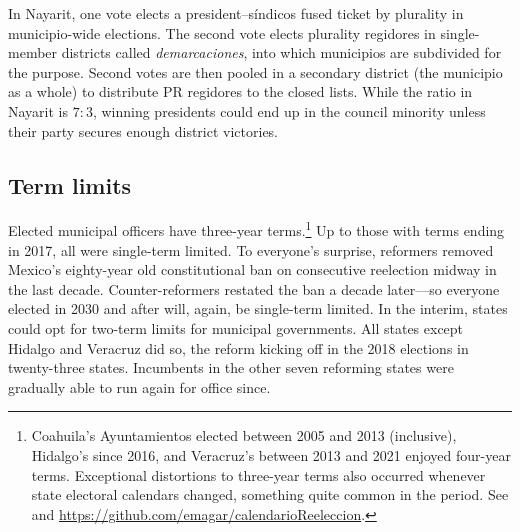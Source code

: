 \documentclass[letter,12pt]{article}
\begin{document}
In Nayarit, one vote elects a president--síndicos fused ticket by plurality in municipio-wide elections. The second vote elects plurality regidores in single-member districts called \emph{demarcaciones}, into which municipios are subdivided for the purpose. Second votes are then pooled in a secondary district (the municipio as a whole) to distribute PR regidores to the closed lists. While the ratio in Nayarit is $7:3$, winning presidents could end up in the council minority unless their party secures enough district victories.

\subsection{Term limits}
Elected municipal officers have three-year terms.\footnote{Coahuila's Ayuntamientos elected between 2005 and 2013 (inclusive), Hidalgo's since 2016, and Veracruz's between 2013 and 2021 enjoyed four-year terms. Exceptional distortions to three-year terms also occurred whenever state electoral calendars changed, something quite common in the period. See \citet{magarInstReel.2017} and \url{https://github.com/emagar/calendarioReeleccion}.} Up to those with terms ending in 2017, all were single-term limited. To everyone's surprise, reformers removed Mexico's eighty-year old constitutional ban on consecutive reelection midway in the last decade. Counter-reformers restated the ban a decade later---so everyone elected in 2030 and after will, again, be single-term limited. In the interim, states could opt for two-term limits for municipal governments. All states except Hidalgo and Veracruz did so, the reform kicking off in the 2018 elections in twenty-three states. Incumbents in the other seven reforming states were gradually able to run again for office since.

\end{document}
